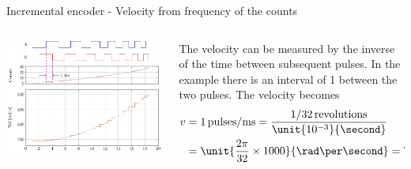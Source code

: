 \documentclass[presentation,aspectratio=169]{beamer}
\begin{document}
\begin{frame}[label={sec:orgb5f6bf1}]{Incremental encoder - Velocity from frequency of the counts}
\begin{columns}
\begin{column}{0.5\columnwidth}
\begin{center}
\includegraphics[width=\textwidth]{../../figures/encoder-signals-freqs}
\end{center}
\end{column}
\begin{column}{0.5\columnwidth}
The velocity can be measured by the inverse of the time between subsequent pulses. In the example there is an interval of \unit{1}{\milli\second} between the two pulses. The velocity becomes
\begin{align*}
 v &= 1 \, \text{pulses/ms} = \frac{1/32 \, \text{revolutions}}{\unit{10^{-3}}{\second}}\\
 &= \unit{\frac{2\pi}{32}\times 1000}{\rad\per\second} = \unit{196.3}{\rad\per\second}
 \end{align*}
\end{column}
\end{columns}
\end{frame}
\end{document}
